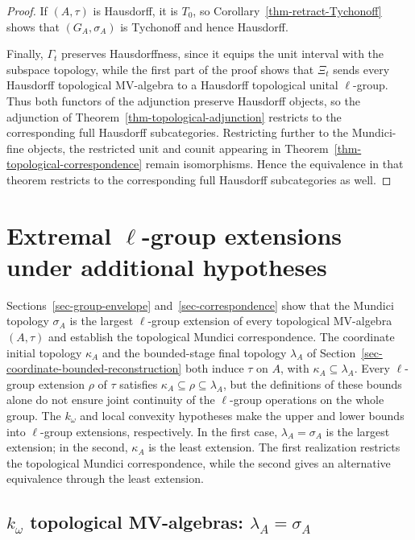 \documentclass[preprint,3p]{elsarticle}
\theoremstyle{plain}
\theoremstyle{definition}
\numberwithin{equation}{section}
\begin{document}
\begin{proof}
If $(A,\tau)$ is Hausdorff, it is $T_0$, so
Corollary~\ref{thm-retract-Tychonoff} shows that
$(G_A,\sigma_A)$ is Tychonoff and hence Hausdorff.

Finally, $\Gamma_t$ preserves Hausdorffness, since it equips the unit
interval with the subspace topology, while the first part of the proof
shows that $\Xi_t$ sends every Hausdorff topological MV-algebra to a
Hausdorff topological unital $\ell$-group.  Thus both functors of the
adjunction preserve Hausdorff objects, so the adjunction of
Theorem~\ref{thm-topological-adjunction} restricts to the corresponding
full Hausdorff subcategories.  Restricting further to the
Mundici-fine objects, the restricted unit and counit appearing in
Theorem~\ref{thm-topological-correspondence} remain isomorphisms.
Hence the equivalence in that theorem restricts to the corresponding
full Hausdorff subcategories as well.
\end{proof}

\section{Extremal \texorpdfstring{$\ell$}{l}-group extensions
under additional hypotheses}
\label{sec-restricted-correspondence}

Sections~\ref{sec-group-envelope} and~\ref{sec-correspondence} show that
the Mundici topology $\sigma_A$ is the largest $\ell$-group extension
of every topological MV-algebra $(A,\tau)$ and establish the
topological Mundici correspondence.
The coordinate initial topology $\kappa_A$ and the bounded-stage final
topology $\lambda_A$ of Section~\ref{sec-coordinate-bounded-reconstruction}
both induce $\tau$ on $A$, with $\kappa_A\subseteq\lambda_A$.
Every $\ell$-group extension $\rho$ of $\tau$ satisfies
$\kappa_A\subseteq\rho\subseteq\lambda_A$, but the definitions of
these bounds alone do not ensure joint continuity of the
$\ell$-group operations on the whole group.
The $k_\omega$ and local convexity hypotheses make the upper and lower
bounds into $\ell$-group extensions, respectively.
In the first case, $\lambda_A=\sigma_A$ is the largest extension;
in the second, $\kappa_A$ is the least extension.
The first realization restricts the topological Mundici correspondence,
while the second gives an alternative equivalence through the least
extension.

\subsection{\texorpdfstring{$k_\omega$}{k-omega} topological MV-algebras:
\texorpdfstring{$\lambda_A=\sigma_A$}{lambda\_A=sigma\_A}}
\label{sec-komega}
\end{document}
